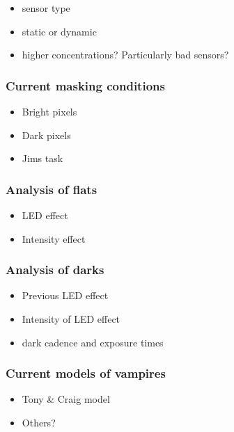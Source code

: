 \begin{itemize}
\tightlist
\item
  sensor type
\item
  static or dynamic
\item
  higher concentrations? Particularly bad sensors?
\end{itemize}

\subsubsection{Current masking
conditions}\label{current-masking-conditions}

\begin{itemize}
\tightlist
\item
  Bright pixels
\item
  Dark pixels
\item
  Jim\textquotesingle s task
\end{itemize}

\subsubsection{Analysis of flats}\label{analysis-of-flats}

\begin{itemize}
\tightlist
\item
  LED effect
\item
  Intensity effect
\end{itemize}

\subsubsection{Analysis of darks}\label{analysis-of-darks}

\begin{itemize}
\tightlist
\item
  Previous LED effect
\item
  Intensity of LED effect
\item
  dark cadence and exposure times
\end{itemize}

\subsubsection{Current models of
vampires}\label{current-models-of-vampires}

\begin{itemize}
\tightlist
\item
  Tony \& Craig model
\item
  Others?
\end{itemize}



